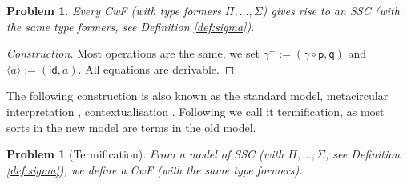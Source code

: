 \documentclass[a4paper,UKenglish,cleveref, autoref, thm-restate]{lipics-v2021}
\newtheorem{problem}[theorem]{Problem}
\newcommand{\p}{\mathsf{p}}
\newcommand{\q}{\mathsf{q}}
\newcommand{\id}{\mathsf{id}}
\begin{document}
\begin{problem}
  Every CwF (with type formers $\Pi, \dots, \Sigma$) gives rise to an SSC (with
  the same type formers, see Definition \ref{def:sigma}).
\end{problem}
\begin{proof}[Construction]
  Most operations are the same, we set $\gamma^+ :=
  (\gamma\circ\p,\q)$ and $\langle a\rangle := (\id,a)$. All equations are derivable.
\end{proof}
The following construction is also known as the standard model,
metacircular interpretation \cite{DBLP:conf/popl/AltenkirchK16},
contextualisation \cite{DBLP:conf/fscd/BocquetKS23}. Following
\cite{kaposi-shallow} we call it termification, as most sorts in the
new model are terms in the old model.
\begin{problem}[Termification]
  From a model of SSC (with $\Pi, \dots, \Sigma$, see Definition
  \ref{def:sigma}), we define a CwF (with the same type formers).
\end{problem}
\end{document}
